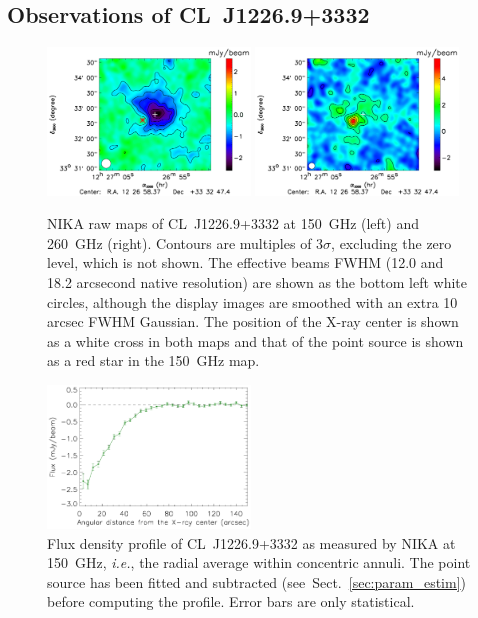 \documentclass[twocolumn,traditabstract]{aa}
\begin{document}
\subsection{Observations of \mbox{CL~J1226.9+3332}}\label{sec:observations}
	\begin{figure}[h]
	\centering
	\includegraphics[width=0.48\textwidth]{Figure/CLJ1226_2mm_map.pdf}
	\includegraphics[width=0.48\textwidth]{Figure/CLJ1226_1mm_map.pdf}
	\caption{NIKA raw maps of \mbox{CL~J1226.9+3332} at 150~GHz (left) and 260~GHz (right). Contours are multiples of 3$\sigma$, excluding the zero level, which is not shown. The effective beams FWHM (12.0 and 18.2 arcsecond native resolution) are shown as the bottom left white circles, although the display images are smoothed with an extra 10 arcsec FWHM Gaussian. The position of the \mbox{X-ray} center is shown as a white cross in both maps and that of the point source is shown as a red star in the 150~GHz map.}
        \label{fig:CL1226map}
	\end{figure}
	
	\begin{figure}[h]
	\centering
	\includegraphics[width=0.48\textwidth]{Figure/profile2mm.pdf}
	\caption{Flux density profile of \mbox{CL~J1226.9+3332} as measured by NIKA at 150~GHz, {\it i.e.}, the radial average within concentric annuli. The point source has been fitted and subtracted (see~Sect.~\ref{sec:param_estim}) before computing the profile. Error bars are only statistical.}
        \label{fig:CL1226profile2mm}
	\end{figure}
	
\end{document}

